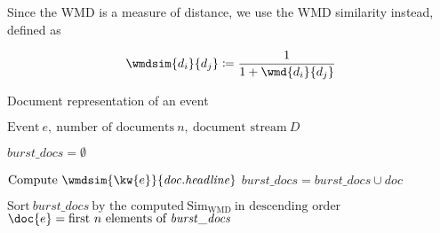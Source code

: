 \begin{enumerate}
Since the WMD is a measure of distance, we use the WMD similarity instead, defined as

\begin{equation}
	\wmdsim{d_{i}}{d_{j}} \coloneqq \frac{1}{1 + \wmd{d_{i}}{d_{j}}}
\end{equation}

\begin{algorithm}[H]
\begin{algorithmic}[1]
\caption{Document representation of an event}
\Input $\text{Event}\ e,\ \text{number of documents}\ n,\ \text{document stream}\ D$

\State $\mathit{burst\_docs} = \emptyset$

		\State $\text{Compute}\ \wmdsim{\kw{e}}{\mathit{doc.headline}}$
		\State $\mathit{burst\_docs} = \mathit{burst\_docs} \cup \mathit{doc}$
	\EndIf
\EndFor

\State $\text{Sort}\ \mathit{burst\_docs}\ \text{by the computed}\ \text{Sim}_{\text{WMD}} \ \text{in descending order}$
\Output $\doc{e} = \text{first}\ n\ \text{elements of}\ \mathit{burst\_docs}$
\end{algorithmic}
\end{algorithm}

\end{enumerate}